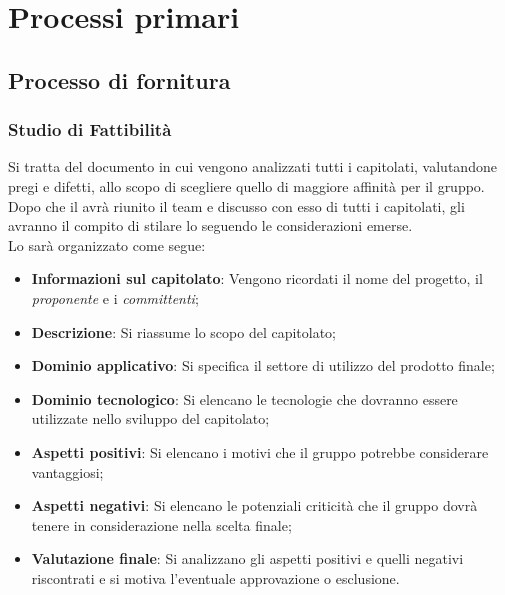 \section{Processi primari}
\subsection{Processo di fornitura}

\subsubsection{Studio di Fattibilità}
Si tratta del documento in cui vengono analizzati tutti i capitolati, valutandone pregi e difetti, allo scopo di scegliere quello di maggiore affinità per il gruppo.
Dopo che il \RdP avrà riunito il team e discusso con esso di tutti i capitolati, gli \anas avranno il compito di stilare lo \SdF seguendo le considerazioni emerse.\\
Lo \SdF sarà organizzato come segue:
\begin{itemize}
	\item \textbf{Informazioni sul capitolato}:
	Vengono ricordati il nome del progetto, il \textit{proponente} e i \textit{committenti};
	\item \textbf{Descrizione}:
	Si riassume lo scopo del capitolato;
	\item \textbf{Dominio applicativo}:
	Si specifica il settore di utilizzo del prodotto finale;
	\item \textbf{Dominio tecnologico}:
	Si elencano le tecnologie che dovranno essere utilizzate nello sviluppo del capitolato;
	\item \textbf{Aspetti positivi}:
	Si elencano i motivi che il gruppo potrebbe considerare vantaggiosi;
	\item \textbf{Aspetti negativi}:
	Si elencano le potenziali criticità che il gruppo dovrà tenere in considerazione nella scelta finale;
	\item \textbf{Valutazione finale}:
	Si analizzano gli aspetti positivi e quelli negativi riscontrati e si motiva l'eventuale approvazione o esclusione.
\end{itemize}

\begin{comment}
\subsubsection{Rapporti con il proponente}
Una volta scelto il capitolato, ci si dovrà confrontare con il proponente come segue:
\begin{itemize}
	\item \textbf{Primo contatto}
	Sfruttando i contatti messi a disposizione nella descrizione del capitolato, si contatta il proponente per verificarne l'effettiva disponibilità.
	\item \textbf{Definizione dei canali di comunicazione}
	Si dovrà concordare un metodo di comunicazione adatto ad entrambe le parti, per un confronto facile ed immediato tra fornitore e proponente.
\end{itemize}
\\
Confronto per le tecnologie da usare.
\end{comment}

